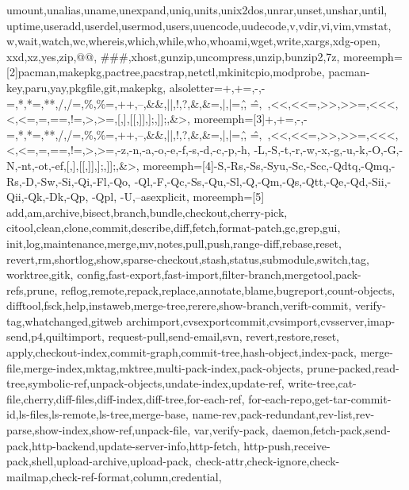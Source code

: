 {{  umount,unalias,uname,unexpand,uniq,units,unix2dos,unrar,unset,unshar,until,
  uptime,useradd,userdel,usermod,users,uuencode,uudecode,v,vdir,vi,vim,vmstat,
  w,wait,watch,wc,whereis,which,while,who,whoami,wget,write,xargs,xdg-open,
  xxd,xz,yes,zip,@@, \#\#\#,xhost,gunzip,uncompress,unzip,bunzip2,7z},
  moreemph=[2]{pacman,makepkg,pactree,pacstrap,netctl,mkinitcpio,modprobe,
  pacman-key,paru,yay,pkgfile,git,makepkg},
  alsoletter={+,+=,-,-=,*,*=,**,/,/=,\%,\%=,++,--,\&\&,||,!,?,\&,\&=,|,|=,\^,
  \^=,~,<<,<<=,>>,>>=,<<<,<,<=,=,==,!=,>,>=,[,],[[,]],];,]];,\&>},
  moreemph=[3]{+,+=,-,-=,*,*=,**,/,/=,\%,\%=,++,--,\&\&,||,!,?,\&,\&=,|,|=,\^,
  \^=,~,<<,<<=,>>,>>=,<<<,<,<=,=,==,!=,>,>=,-z,-n,-a,-o,-e,-f,-s,-d,-c,-p,-h,
  -L,-S,-t,-r,-w,-x,-g,-u,-k,-O,-G,-N,-nt,-ot,-ef,[,],[[,]],];,]];,\&>},
  moreemph=[4]{-S,-Rs,-Ss,-Syu,-Sc,-Scc,-Qdtq,-Qmq,-Rs,-D,-Sw,-Si,-Qi,-Fl,-Qo,
  -Ql,-F,-Qc,-Ss,-Qu,-Sl,-Q,-Qm,-Qs,-Qtt,-Qe,-Qd,-Sii,-Qii,-Qk,-Dk,-Qp, -Qpl,
  -U,--asexplicit},
  moreemph=[5]{%
    add,am,archive,bisect,branch,bundle,checkout,cherry-pick,
    citool,clean,clone,commit,describe,diff,fetch,format-patch,gc,grep,gui,
    init,log,maintenance,merge,mv,notes,pull,push,range-diff,rebase,reset,
    revert,rm,shortlog,show,sparse-checkout,stash,status,submodule,switch,tag,
    worktree,gitk,
    config,fast-export,fast-import,filter-branch,mergetool,pack-refs,prune,
    reflog,remote,repack,replace,annotate,blame,bugreport,count-objects,
    difftool,fsck,help,instaweb,merge-tree,rerere,show-branch,verift-commit,
    verify-tag,whatchanged,gitweb
    archimport,cvsexportcommit,cvsimport,cvsserver,imap-send,p4,quiltimport,
    request-pull,send-email,svn,
    revert,restore,reset,
    apply,checkout-index,commit-graph,commit-tree,hash-object,index-pack,
    merge-file,merge-index,mktag,mktree,multi-pack-index,pack-objects,
    prune-packed,read-tree,symbolic-ref,unpack-objects,undate-index,update-ref,
    write-tree,cat-file,cherry,diff-files,diff-index,diff-tree,for-each-ref,
    for-each-repo,get-tar-commit-id,ls-files,ls-remote,ls-tree,merge-base,
    name-rev,pack-redundant,rev-list,rev-parse,show-index,show-ref,unpack-file,
    var,verify-pack,
    daemon,fetch-pack,send-pack,http-backend,update-server-info,http-fetch,
    http-push,receive-pack,shell,upload-archive,upload-pack,
    check-attr,check-ignore,check-mailmap,check-ref-format,column,credential,
}}
